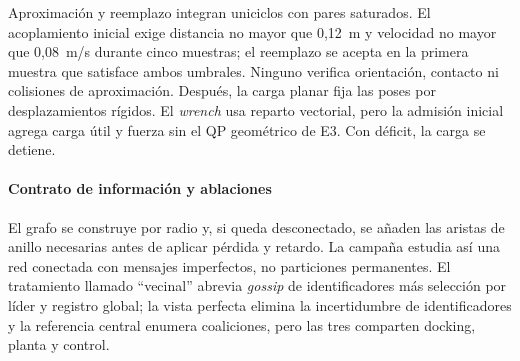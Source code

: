 Aproximación y reemplazo integran uniciclos con pares saturados. El acoplamiento inicial exige distancia no mayor que 0,12~m y velocidad no mayor que 0,08~m/s durante cinco muestras; el reemplazo se acepta en la primera muestra que satisface ambos umbrales. Ninguno verifica orientación, contacto ni colisiones de aproximación. Después, la carga planar fija las poses por desplazamientos rígidos. El \emph{wrench} usa reparto vectorial, pero la admisión inicial agrega carga útil y fuerza sin el QP geométrico de E3. Con déficit, la carga se detiene.

\paragraph{Contrato de información y ablaciones}

El grafo se construye por radio y, si queda desconectado, se añaden las aristas de anillo necesarias antes de aplicar pérdida y retardo. La campaña estudia así una red conectada con mensajes imperfectos, no particiones permanentes. El tratamiento llamado ``vecinal'' abrevia \emph{gossip} de identificadores más selección por líder y registro global; la vista perfecta elimina la incertidumbre de identificadores y la referencia central enumera coaliciones, pero las tres comparten docking, planta y control.

